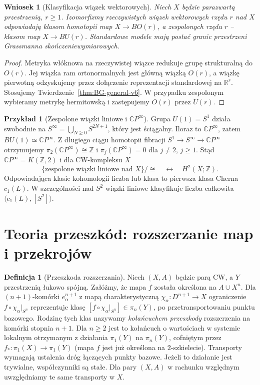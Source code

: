 \documentclass[11pt,a4paper,oneside]{report}
\newcommand{\R}{\mathbb{R}}
\newcommand{\C}{\mathbb{C}}
\newcommand{\Z}{\mathbb{Z}}
\theoremstyle{plain}
\newtheorem{wniosek}[twierdzenie]{Wniosek}
\theoremstyle{definition}
\newtheorem{definicja}[twierdzenie]{Definicja}
\newtheorem{przyklad}[twierdzenie]{Przykład}
\theoremstyle{remark}
\begin{document}
\begin{wniosek}[Klasyfikacja wiązek wektorowych]
Niech $X$ będzie parazwartą przestrzenią, $r\ge1$.
Izomorfizmy rzeczywistych wiązek wektorowych rzędu $r$
nad $X$ odpowiadają klasom homotopii map
$X\to BO(r)$, a zespolonych rzędu $r$ -- klasom map
$X\to BU(r)$. Standardowe modele mają postać
granic przestrzeni Grassmanna skończeniewymiarowych.
\end{wniosek}
\begin{proof}
Metryka włóknowa na rzeczywistej wiązce redukuje
grupę strukturalną do $O(r)$. Jej wiązka ram
ortonormalnych jest główną wiązką $O(r)$,
a wiązkę pierwotną odzyskujemy przez dołączenie
reprezentacji standardowej na $\R^r$.
Stosujemy Twierdzenie~\ref{thm:BG-general-v6}.
W przypadku zespolonym wybieramy metrykę hermitowską
i zastępujemy $O(r)$ przez $U(r)$.
\end{proof}

\begin{przyklad}[Zespolone wiązki liniowe i $\C P^\infty$]
Grupa $U(1)=S^1$ działa swobodnie na
$S^\infty=\bigcup_{N\ge0}S^{2N+1}$, który jest
ściągalny. Iloraz to $\C P^\infty$, zatem
$BU(1)\simeq\C P^\infty$. Z długiego ciągu homotopii
fibracji $S^1\to S^\infty\to\C P^\infty$ otrzymujemy
$\pi_2(\C P^\infty)\cong\Z$ i
$\pi_j(\C P^\infty)=0$ dla $j\ne2$, $j\ge1$.
Stąd $\C P^\infty=K(\Z,2)$ i dla CW-kompleksu $X$
\[
\{\text{zespolone wiązki liniowe nad }X\}/\cong
\quad\longleftrightarrow\quad H^2(X;\Z).
\]
Odpowiadająca klasie kohomologii liczba lub klasa to
pierwsza klasa Cherna $c_1(L)$. W szczególności
nad $S^2$ wiązki liniowe klasyfikuje liczba całkowita
$\langle c_1(L),[S^2]\rangle$.
\end{przyklad}

\section{Teoria przeszkód: rozszerzanie map i przekrojów}
\begin{definicja}[Przeszkoda rozszerzania]
Niech $(X,A)$ będzie parą CW, a $Y$ przestrzenią
łukowo spójną. Załóżmy, że mapa $f$ została określona
na $A\cup X^n$. Dla $(n+1)$-komórki
$e_\alpha^{n+1}$ z mapą charakterystyczną
$\chi_\alpha:D^{n+1}\to X$ ograniczenie
$f\circ\chi_\alpha|_{S^n}$ reprezentuje klasę
$[f\circ\chi_\alpha|_{S^n}]\in\pi_n(Y)$,
po przetransportowaniu punktu bazowego.
Rodzinę tych klas nazywamy \emph{kołańcuchem przeszkody}
rozszerzenia na komórki stopnia $n+1$.
Dla $n\ge2$ jest to kołańcuch o wartościach
w systemie lokalnym otrzymanym z działania
$\pi_1(Y)$ na $\pi_n(Y)$, cofniętym przez
$f_*:\pi_1(X)\to\pi_1(Y)$ (mapa $f$ jest już
określona na $2$-szkielecie). Transporty wymagają
ustalenia dróg łączących punkty bazowe. Jeżeli
to działanie jest trywialne, współczynniki są stałe.
Dla pary $(X,A)$ w rachunku względnym uwzględniamy
te same transporty w $X$.
\end{definicja}
\end{document}
